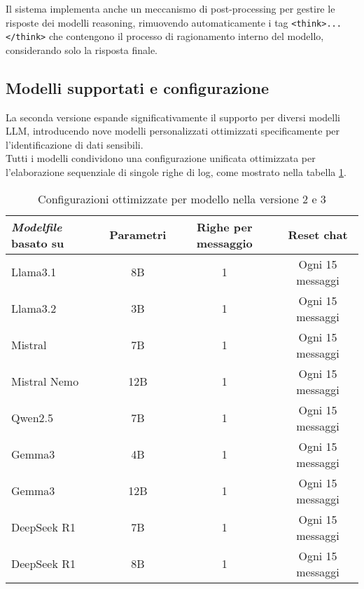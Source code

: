 \documentclass[12pt]{report}
\begin{document}
Il sistema implementa anche un meccanismo di post-processing per gestire le risposte dei modelli reasoning, rimuovendo automaticamente i tag \texttt{<think>...</think>} che contengono il processo di ragionamento interno del modello, considerando solo la risposta finale.

\subsection{Modelli supportati e configurazione}
\label{subsec:ver2_modelli_supportati}

La seconda versione espande significativamente il supporto per diversi modelli LLM, introducendo nove modelli personalizzati ottimizzati specificamente per l'identificazione di dati sensibili. \\
Tutti i modelli condividono una configurazione unificata ottimizzata per l'elaborazione sequenziale di singole righe di log, come mostrato nella tabella \ref{tab:modelli_llm_ver2}.

\begin{table}[h!]
    \centering
    \begin{tabular}{|l|c|c|c|}
        \hline
        \textbf{\textit{Modelfile} basato su} & \textbf{Parametri} & \textbf{Righe per messaggio} & \textbf{Reset chat} \\ \hline
        Llama3.1         & 8B                 & 1                            & Ogni 15 messaggi    \\ \hline
        Llama3.2         & 3B                 & 1                            & Ogni 15 messaggi    \\ \hline
        Mistral          & 7B                 & 1                            & Ogni 15 messaggi    \\ \hline
        Mistral Nemo     & 12B                & 1                            & Ogni 15 messaggi    \\ \hline
        Qwen2.5          & 7B                 & 1                            & Ogni 15 messaggi    \\ \hline
        Gemma3           & 4B                 & 1                            & Ogni 15 messaggi    \\ \hline
        Gemma3           & 12B                & 1                            & Ogni 15 messaggi    \\ \hline
        DeepSeek R1      & 7B                 & 1                            & Ogni 15 messaggi    \\ \hline
        DeepSeek R1      & 8B                 & 1                            & Ogni 15 messaggi    \\ \hline
    \end{tabular}
    \caption{Configurazioni ottimizzate per modello nella versione 2 e 3}
    \label{tab:modelli_llm_ver2}
\end{table}
\end{document}
